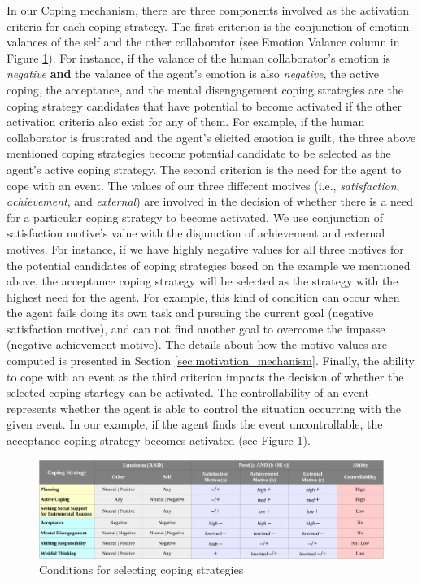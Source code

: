 \documentclass[12pt]{report}
\begin{document}
In our Coping mechanism, there are three components involved as the activation
criteria for each coping strategy. The first criterion is the conjunction of
emotion valances of the self and the other collaborator (see Emotion Valance
column in Figure \ref{fig:coping_strategies}). For instance, if the valance of
the human collaborator's emotion is \textit{negative} \textbf{and} the valance
of the agent's emotion is also \textit{negative}, the active coping, the
acceptance, and the mental disengagement coping strategies are the coping
strategy candidates that have potential to become activated if the other
activation criteria also exist for any of them. For example, if the human
collaborator is frustrated and the agent's elicited emotion is guilt, the three
above mentioned coping strategies become potential candidate to be selected as
the agent's active coping strategy. The second criterion is the need for the
agent to cope with an event. The values of our three different motives (i.e.,
\textit{satisfaction}, \textit{achievement}, and \textit{external}) are involved
in the decision of whether there is a need for a particular coping strategy to
become activated. We use conjunction of satisfaction motive's value with the
disjunction of achievement and external motives. For instance, if we have highly
negative values for all three motives for the potential candidates of coping
strategies based on the example we mentioned above, the acceptance coping
strategy will be selected as the strategy with the highest need for the agent.
For example, this kind of condition can occur when the agent fails doing its own
task and pursuing the current goal (negative satisfaction motive), and can not
find another goal to overcome the impasse (negative achievement motive). The
details about how the motive values are computed is presented in Section
\ref{sec:motivation_mechanism}. Finally, the ability to cope with an event as
the third criterion impacts the decision of whether the selected coping startegy
can be activated. The controllability of an event represents whether the agent
is able to control the situation occurring with the given event. In our
example, if the agent finds the event uncontrollable, the acceptance coping
strategy becomes activated (see Figure \ref{fig:coping_strategies}).

\begin{figure}
  \centering
  \includegraphics[width=1\textwidth]{figure/coping_algorithms_short_croped.pdf}
  \caption{Conditions for selecting coping strategies}
  \label{fig:coping_strategies}
\end{figure}
\end{document}
